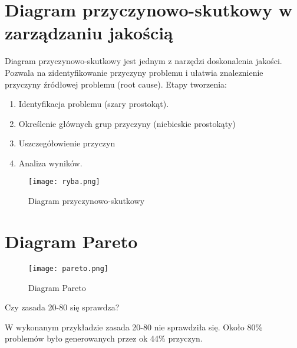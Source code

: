\clearpage


\section{Diagram przyczynowo-skutkowy w zarządzaniu jakością}

Diagram przyczynowo-skutkowy jest jednym z narzędzi doskonalenia jakości. Pozwala na zidentyfikowanie przyczyny problemu i ułatwia znaleznienie przyczyny źródłowej problemu (root cause). Etapy tworzenia:
\begin{enumerate}
\item	Identyfikacja problemu (szary prostokąt).
\item	Określenie głównych grup przyczyny (niebieskie prostokąty)
\item	Uszczegółowienie przyczyn 
\item	Analiza wyników.
\end{enumerate}

\begin{figure}[!h]
\begin{center}
\texttt{[image: ryba.png]}
\caption[Diagram przyczynowo-skutkowy]{Diagram przyczynowo-skutkowy}
\label{rysunekProces}
\end{center}
\end{figure}

\clearpage




\section{Diagram Pareto}

\begin{figure}[!h]
\begin{center}
\texttt{[image: pareto.png]}
\caption[Diagram Pareto]{Diagram Pareto}
\label{rysunekProces}
\end{center}
\end{figure}


Czy zasada 20-80 się sprawdza?

W wykonanym przykładzie zasada 20-80 nie sprawdziła się.  Około 80\% problemów było generowanych przez ok 44\% przyczyn.



